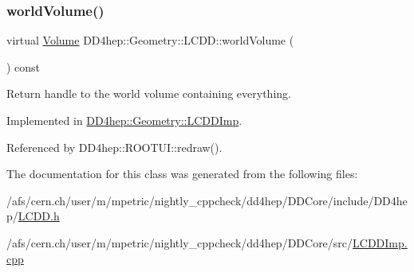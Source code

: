 \hypertarget{class_d_d4hep_1_1_geometry_1_1_l_c_d_d_aa7d089039516ff312cf95168288019fe}{}\label{class_d_d4hep_1_1_geometry_1_1_l_c_d_d_aa7d089039516ff312cf95168288019fe} 
\subsubsection{\texorpdfstring{world\+Volume()}{worldVolume()}}
{\footnotesize\ttfamily virtual \hyperlink{class_d_d4hep_1_1_geometry_1_1_volume}{Volume} D\+D4hep\+::\+Geometry\+::\+L\+C\+D\+D\+::world\+Volume (\begin{DoxyParamCaption}{ }\end{DoxyParamCaption}) const\hspace{0.3cm}{\ttfamily [pure virtual]}}



Return handle to the world volume containing everything. 



Implemented in \hyperlink{class_d_d4hep_1_1_geometry_1_1_l_c_d_d_imp_ad066459dab51944a902249ceee84572d}{D\+D4hep\+::\+Geometry\+::\+L\+C\+D\+D\+Imp}.



Referenced by D\+D4hep\+::\+R\+O\+O\+T\+U\+I\+::redraw().



The documentation for this class was generated from the following files\+:\begin{DoxyCompactItemize}
\item 
/afs/cern.\+ch/user/m/mpetric/nightly\+\_\+cppcheck/dd4hep/\+D\+D\+Core/include/\+D\+D4hep/\hyperlink{_l_c_d_d_8h}{L\+C\+D\+D.\+h}\item 
/afs/cern.\+ch/user/m/mpetric/nightly\+\_\+cppcheck/dd4hep/\+D\+D\+Core/src/\hyperlink{_l_c_d_d_imp_8cpp}{L\+C\+D\+D\+Imp.\+cpp}\end{DoxyCompactItemize}
